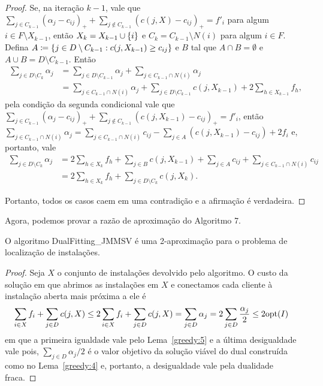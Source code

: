 \begin{proof}
Se, na iteração $k-1$, vale que $\sum_{j \in C_{k-1}} (\alpha_j - c_{ij})_+ + \sum_{j \not \in C_{k-1}}(c(j,X) - c_{ij})_+ = f'_i$ para algum $i \in F \setminus X_{k-1}$, então $X_k = X_{k-1} \cup \{i\}$ e $C_k = C_{k-1} \setminus N(i)$ para algum $i \in F$. Defina $A\coloneqq \{j \in D\setminus C_{k-1}: c(j,X_{k-1}) \geq c_{ij}\}$ e $B$ tal que $A \cap B = \emptyset$ e $A \cup B = D\setminus C_{k-1}$. Então
\begin{subequations}
\begin{align*}
\sum_{j \in D \setminus C_k} \alpha_j &= \sum_{j \in D\setminus C_{k-1}} \alpha_j + \sum_{j \in C_{k-1}\cap N(i)} \alpha_j \\
&= \sum_{j \in C_{k-1}\cap N(i)} \alpha_j +  \sum_{j \in D\setminus C_{k-1}}c(j,X_{k-1}) + 2 \sum_{h \in X_{k-1}} f_h,
\end{align*}
\end{subequations}
pela condição da segunda condicional vale que $\sum_{j \in C_{k-1}} (\alpha_j - c_{ij})_+ + \sum_{j \not \in C_{k-1}}(c(j,X_{k-1}) - c_{ij})_+ = f'_i$, então $\sum_{j \in C_{k-1}\cap N(i)} \alpha_j = \sum_{j \in C_{k-1}\cap N(i)} c_{ij} - \sum_{j \in A} (c(j,X_{k-1}) - c_{ij}) + 2f_i$ e, portanto, vale
\begin{subequations}
\begin{align*}
\sum_{j \in D \setminus C_k} \alpha_j &= 2\sum_{h \in X_k} f_h + \sum_{j \in B} c(j,X_{k-1}) + \sum_{j \in A} c_{ij} + \sum_{j \in C_{k-1} \cap N(i)} c_{ij}\\
&= 2 \sum_{h \in X_k} f_h + \sum_{j \in D \setminus C_k} c(j,X_k)  . 
\end{align*}
\end{subequations}

Portanto, todos os casos caem em uma contradição e a afirmação é verdadeira.
\end{proof}


Agora, podemos provar a razão de aproximação do Algoritmo 7.

\begin{theorem}
O algoritmo {\sc DualFitting\_JMMSV} é uma 2-aproximação para o problema de localização de instalações.
\end{theorem} 
\begin{proof}
Seja $X$ o conjunto de instalações devolvido pelo algoritmo.  O custo da solução em que abrimos as instalações em $X$ e conectamos cada cliente à instalação aberta mais próxima a ele é
\begin{subequations}
\begin{align*}
\sum_{i \in X} f_i + \sum_{j \in D}c(j,X) &\leq 2\sum_{i \in X} f_i + \sum_{j \in D}c(j,X) = \sum_{j \in D} \alpha_j = 2\sum_{j \in D} \frac{\alpha_j}{2} \leq 2 \mathrm{opt}(I)  
\end{align*}
\end{subequations}
em que a primeira igualdade vale pelo Lema~\ref{greedy:5} e a última desigualdade vale pois, $\sum_{j \in D} \alpha_j/2 $ é o valor objetivo da solução viável do dual construída como no Lema~\ref{greedy:4} e, portanto, a desigualdade vale pela dualidade fraca.
\end{proof}

